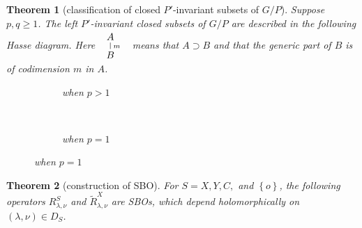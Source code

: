 \documentclass[portrait,final,paperwidth=90cm,paperheight=120cm,fontscale=0.3]{baposter}
\newtheorem{theorem}{Theorem}
\theoremstyle{definition}
\begin{document}
\begin{poster}
 {
\begin{theorem}[classification of closed $P'$-invariant subsets of $G/P$]
	Suppose $p,q\ge1$.
	The left $P'$-invariant closed subsets of $G/P$ are described in the following Hasse diagram. Here 
	$
	\begin{array}{l}
	        \xymatrixrowsep{0.5pc}
		\xymatrix{A\ar@{-}[d]^m\\B}
	\end{array}
	$
	means that $A\supset B$ and that the generic part of $B$ is of codimension $m$ in $A$.
	\vspace*{-0.5cm}
  \begin{figure}[H]
    \centering
    \begin{subfigure}[t]{0.3\textwidth}
	    \xymatrixrowsep{0.5pc}
	\caption{when $p>1$}
    \end{subfigure}
    ~ %
    \begin{subfigure}[t]{0.3\textwidth}
	    \xymatrixrowsep{0.5pc}
	    {}
	\caption{when $p=1$}
    \end{subfigure}
\end{figure}
\end{theorem}
 }
 {
\begin{theorem}[construction of SBO]\label{thm:construction}
	For $S=X,Y,C,$ and $\left\{ o \right\}$, the following operators $R_{\lambda,\nu}^S$ and $\tilde{R}_{\lambda,\nu}^X$ are SBOs, which depend holomorphically on $(\lambda,\nu)\in D_S$. 
	

\end{theorem}}
\end{poster}
\end{document}
